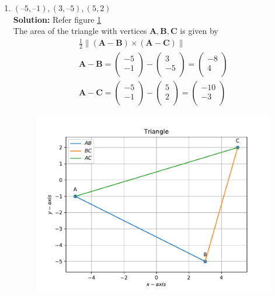 \documentclass[12pt]{article}
\providecommand{\brak}[1]{\ensuremath{\left(#1\right)}}
\providecommand{\norm}[1]{\left\lVert#1\right\rVert}
\newcommand{\solution}{\noindent \textbf{Solution: }}
\newcommand{\myvec}[1]{\ensuremath{\begin{pmatrix}#1\end{pmatrix}}}
\let\vec\mathbf
\begin{document}
\begin{enumerate}
\begin{enumerate}
\item $(–5, –1), (3, –5), (5, 2)$ \\ 
\solution Refer figure \ref{fig:Fig2} \\
The area of the triangle with vertices $\vec{A}, \vec{B}, \vec{C}$ is given by  
  \label{prop:area2e}
  \begin{align}
    \label{eq:area2e}
	\frac{1}{2}\norm{\brak{\vec{A}-\vec{B}} \times \brak{\vec{A}-\vec{C}}} \\
	 \vec{A}-\vec{B} =  \myvec{
  -5 \\
  -1 \\
 } - \myvec{
  3 \\
  -5 \\
 } = \myvec{
 -8 \\
 4 \\
 }
 \\
 \vec{A}-\vec{C} =  \myvec{
  -5 \\
  -1 \\
 } - \myvec{
  5 \\
  2 \\
 } = \myvec{
 -10 \\
 -3 \\
 }
\end{align}
\begin{figure}[!h]
	\begin{center}
		\includegraphics[width=\columnwidth]{./figs/problem1b.pdf}
	\end{center}
\caption{}
\label{fig:Fig2}
\end{figure}


\end{enumerate}
\end{enumerate}
\end{document}
